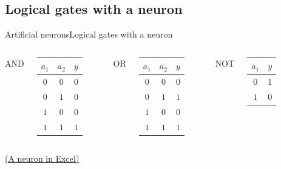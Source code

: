 \documentclass[10pt,compress]{beamer} %
\begin{document}
\subsection{Logical gates with a neuron}
\begin{frame}{Artificial neurons}{Logical gates with a neuron}
    \begin{columns}
	   		\centering AND\\
            

			 \begin{tabular}{ccc}\hline
			 $a_1$ & $a_2$ & $y$ \\\hline
			 $0$ & $0$ & $0$ \\
			 $0$ & $1$ & $0$ \\
			 $1$ & $0$ & $0$ \\
			 $1$ & $1$ & $1$ \\
			 \end{tabular}
	   		\centering OR\\
            

			 \begin{tabular}{ccc}\hline
			 $a_1$ & $a_2$ & $y$ \\\hline
			 $0$ & $0$ & $0$ \\
			 $0$ & $1$ & $1$ \\
			 $1$ & $0$ & $0$ \\
			 $1$ & $1$ & $1$ \\
			 \end{tabular}
	   		\centering NOT\\\bigskip
            
			\vspace{1cm}
			 \begin{tabular}{cc}\hline
			 $a_1$ & $y$ \\\hline
			 $0$ & $1$ \\
			 $1$ & $0$ \\
			 \end{tabular}
    \end{columns}
	\bigskip
	\centering \href{https://github.com/dfbarrero/aiCourse/raw/master/ann/artificialNeuron.xlsx}{(A neuron in Excel)}
\end{frame}
\end{document}
